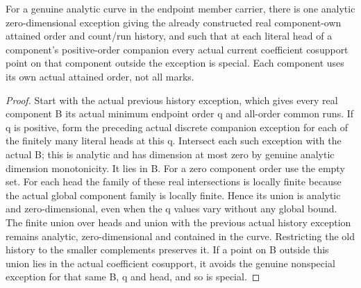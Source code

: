 \begin{theorem}
\label{hir:member-masked-positive-component-special-history}
\leanok
For a genuine analytic curve in the endpoint member carrier, there is one
analytic zero-dimensional exception giving the already constructed real
component-own attained order and count/run history, and such that at each
literal head of a component's positive-order companion every actual current
coefficient cosupport point on that component outside the exception is
special. Each component uses its own actual attained order, not all marks.
\end{theorem}
\begin{proof}
Start with the actual previous history exception, which gives every real
component B its actual minimum endpoint order q and all-order common runs.
If q is positive, form the preceding actual discrete companion exception
for each of the finitely many literal heads at this q. Intersect each such
exception with the actual B; this is analytic and has dimension at most
zero by genuine analytic dimension monotonicity. It lies in B. For a zero
component order use the empty set. For each head the family of these real
intersections is locally finite because the actual global component family
is locally finite. Hence its union is analytic and zero-dimensional, even
when the q values vary without any global bound. The finite union over
heads and union with the previous actual history exception remains analytic,
zero-dimensional and contained in the curve. Restricting the old history
to the smaller complements preserves it. If a point on B outside this
union lies in the actual coefficient cosupport, it avoids the genuine
nonspecial exception for that same B, q and head, and so is special.
\end{proof}

